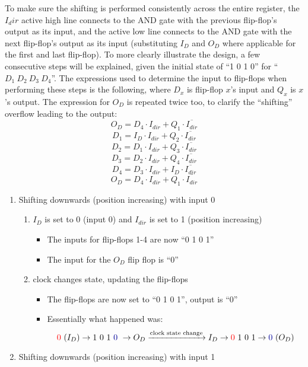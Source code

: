 \documentclass[11pt]{article} %
\begin{document}
\begin{enumerate}[(a)]
	To make sure the shifting is performed consistently across the entire register, the $I_dir$ active high line connects to the AND gate with the previous flip-flop's output as its input, and the active low line connects to the AND gate with the next flip-flop's output as its input (substituting $I_D$ and $O_D$ where applicable for the first and last flip-flop).
	\newpage
	To more clearly illustrate the design, a few consecutive steps will be explained, given the initial state of ``1 0 1 0'' for ``$D_1\ D_2\ D_3\ D_4$''. The expressions used to determine the input to flip-flops when performing these steps is the following, where $D_x$ is flip-flop $x$'s input and $Q_x$ is $x$'s output. The expression for $O_D$ is repeated twice too, to clarify the ``shifting'' overflow leading to the output: \\
	\[ O_D = D_4\cdot I_{dir} + Q_1\cdot \overline{I_{dir}} \]
	\[ D_1 = I_D\cdot I_{dir} + Q_2\cdot \overline{I_{dir}} \]
	\[ D_2 = D_1\cdot I_{dir} + Q_3\cdot \overline{I_{dir}} \]
	\[ D_3 = D_2\cdot I_{dir} + Q_4\cdot \overline{I_{dir}} \]
	\[ D_4 = D_3\cdot I_{dir} + I_D\cdot \overline{I_{dir}} \]
	\[ O_D = D_4\cdot I_{dir} + Q_1\cdot \overline{I_{dir}} \]
	\begin{enumerate}
		\item Shifting downwards (position increasing) with input 0\begin{enumerate}
			\item $I_D$ is set to 0 (input 0) and $I_{dir}$ is set to 1 (position increasing)\begin{itemize}
				\item The inputs for flip-flops 1-4 are now ``0 1 0 1''
				\item The input for the $O_D$ flip flop is ``0''
			\end{itemize}
			\item clock changes state, updating the flip-flops\begin{itemize}
				\item The flip-flops are now set to ``0 1 0 1'', output is ``0''
				\item Essentially what happened was: \[ \textcolor{red}{0}\ (I_D)\rightarrow 1\ 0\ 1\ \textcolor{darkBlue}{0}\ \rightarrow O_D \xrightarrow{\text{clock state change}} I_D \rightarrow \textcolor{red}{0}\ 1\ 0\ 1\rightarrow \textcolor{darkBlue}{0}\ (O_D) \]
			\end{itemize}
		\end{enumerate}
		\item Shifting downwards (position increasing) with input 1\begin{enumerate}

\end{enumerate}
\end{enumerate}
\end{enumerate}
\end{document}
